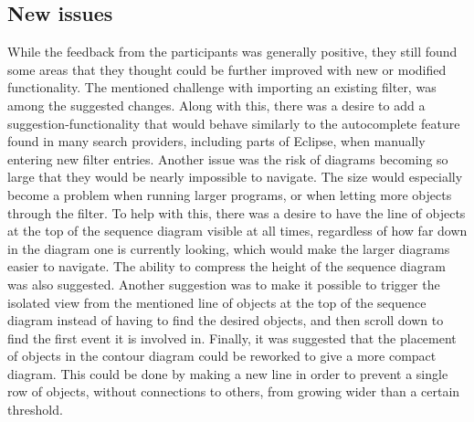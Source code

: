 \subsection{New issues}\label{jiveEvalIssues}
While the feedback from the participants was generally positive, they still found some areas that they thought could be further improved with new or modified functionality.
The mentioned challenge with importing an existing filter, was among the suggested changes.
Along with this, there was a desire to add a suggestion-functionality that would behave similarly to the autocomplete feature found in many search providers, including parts of Eclipse, when manually entering new filter entries.
Another issue was the risk of diagrams becoming so large that they would be nearly impossible to navigate.
The size would especially become a problem when running larger programs, or when letting more objects through the filter.
To help with this, there was a desire to have the line of objects at the top of the sequence diagram visible at all times, regardless of how far down in the diagram one is currently looking, which would make the larger diagrams easier to navigate.
The ability to compress the height of the sequence diagram was also suggested.
Another suggestion was to make it possible to trigger the isolated view from the mentioned line of objects at the top of the sequence diagram instead of having to find the desired objects, and then scroll down to find the first event it is involved in.
Finally, it was suggested that the placement of objects in the contour diagram could be reworked to give a more compact diagram.
This could be done by making a new line in order to prevent a single row of objects, without connections to others, from growing wider than a certain threshold.
